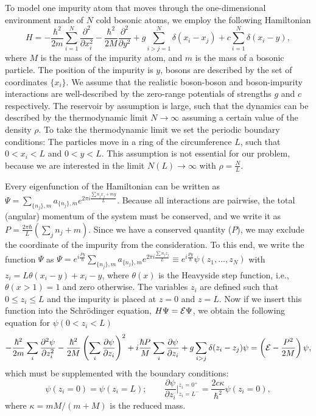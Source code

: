 \documentclass[twocolumn,amsmath,amssymb,showpacs,prl,superscriptaddress,aps]{revtex4-1}
\begin{document}
To model one impurity atom that moves through the one-dimensional environment made of $N$ cold bosonic atoms, we employ the following Hamiltonian
\begin{equation}
H=-\frac{\hbar^2}{2m}\sum_{i=1}^N\frac{\partial^2}{\partial x_i^2}-\frac{\hbar^2}{2M}\frac{\partial^2}{\partial y^2}+g\sum_{i>j=1}^N\delta(x_i-x_j)+c\sum_{i=1}^N \delta(x_i-y),
\end{equation}
where $M$ is the mass of the impurity atom, and $m$ is the mass of a bosonic particle. The position of the impurity is $y$, bosons are described by the set of coordinates $\{x_i\}$. 
We assume that the realistic boson-boson and boson-impurity interactions are well-described by the zero-range potentials of strengths $g$ and $c$ respectively. 
The reservoir by assumption is large, such that the dynamics can be described by the thermodynamic limit $N\to \infty$ assuming a certain value of the density $\rho$.
To take the thermodynamic limit we set the periodic boundary conditions: The particles move in a ring of the circumference $L$, such that $0<x_i<L$ and $0<y<L$.
This assumption is not essential for our problem, because we are interested in the limit $N(L)\to \infty$ with $\rho=\frac{N}{L}$.


Every eigenfunction of the Hamiltonian can be written as $\Psi=\sum_{\{n_j\},m} a_{\{n_j\},m}e^{2\pi i \frac{\sum n_jx_j+my}{L}}$. Because all interactions are pairwise, 
the total (angular) momentum of the system must be conserved, and we write it as $P=\frac{2\pi\hbar}{L}\left(\sum_{j} n_j+m\right)$.
Since we have a conserved quantity ($P$), we may exclude the coordinate of the impurity from the consideration. To this end, 
we write the function $\Psi$ as $\Psi=e^{i \frac{P y}{\hbar}}\sum_{\{n_j\},m} a_{\{n_j\},m}e^{2\pi i \frac{\sum n_jz_j}{L}}\equiv e^{i \frac{P y}{\hbar}} \psi(z_1,...,z_N)$ 
with $z_i=L\theta(x_i-y)+x_i-y$, where $\theta(x)$ is the Heavyside step function, i.e., 
$\theta(x>1) = 1$ and zero otherwise. The variables $z_i$ are defined such that $0\leq z_i \leq L$ and the impurity is placed at $z=0$ and $z=L$. Now if we insert this 
function into the Schr{\"o}dinger equation, $H\Psi={\cal E}\Psi$, we obtain the following equation for $\psi(0<z_i<L)$
\begin{equation}
-\frac{\hbar^2}{2m}\sum_i\frac{\partial^2 \psi}{\partial z_i^2}-\frac{\hbar^2}{2M}\left(\sum_{i}\frac{\partial \psi}{\partial z_i}\right)^2
+ i \frac{\hbar P}{M}\sum_{i}\frac{\partial \psi}{\partial z_i}+g\sum_{i>j}\delta(z_i-z_j)\psi=\left({\cal E}-\frac{P^2}{2M}\right)\psi,
\end{equation}
which must be supplemented with the boundary conditions:
\begin{equation}
\psi(z_i=0)=\psi(z_i=L); \qquad \frac{\partial \psi}{\partial z_i}\bigg|^{z_i=0^+}_{z_i=L^-}= \frac{2 c \kappa}{\hbar^2} \psi(z_i=0),
\end{equation}
where $\kappa=mM/(m+M)$ is the reduced mass.
\end{document}
